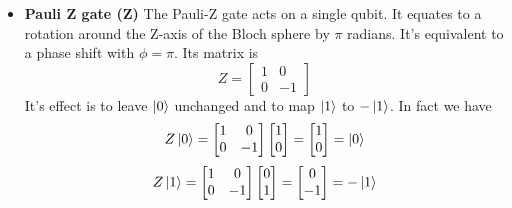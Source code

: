 \documentclass[main.tex]{subfiles}
\theoremstyle{definition}
\begin{document}
\begin{itemize}
	\item \textbf{Pauli Z gate (Z)} The Pauli-Z gate acts on a single qubit. It equates to a rotation around 
	the Z-axis of the Bloch sphere by $\pi$ radians. It's equivalent to a phase shift with $\phi=\pi$.
	Its matrix is
	\begin{equation}
	Z=
	\begin{bmatrix}
	1 & 0\\
	0 & -1
	\end{bmatrix}
	\end{equation}
	It's effect is to leave $\ket{0}$ unchanged and to map $\ket{1}$ to $-\ket{1}$. In fact we have
	$$
	Z\ket{0}=
	\begin{bmatrix}
	1 & 0\\
	0 & -1
	\end{bmatrix}
	\begin{bmatrix}
	1 \\
	0
	\end{bmatrix}
	=
	\begin{bmatrix}
	1 \\
	0
	\end{bmatrix}
	=
	\ket{0}
	$$
	$$
	Z\ket{1}=
	\begin{bmatrix}
	1 & 0\\
	0 & -1
	\end{bmatrix}
	\begin{bmatrix}
	0 \\
	1
	\end{bmatrix}
	=
	\begin{bmatrix}
	0 \\
	-1
	\end{bmatrix}
	=
	-\ket{1}
	$$	
	\end{itemize}
\end{document}
